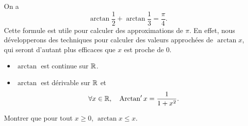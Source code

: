 \documentclass{magnolia}
\begin{document}
\begin{remarqueUnique}
\remarque On a
\[\arctan\frac{1}{2}+\arctan\frac{1}{3}=\frac{\pi}{4}.\]
Cette formule est utile pour calculer des approximations de $\pi$. En effet,
nous développerons des techniques pour calculer des valeurs approchées de
$\arctan x$, qui seront d'autant plus efficaces que $x$ est proche de 0.
\end{remarqueUnique}


\begin{proposition}[utile=-3]
\begin{itemize}
\item $\arctan$ est continue sur $\mathbb{R}$.
\item $\arctan$ est dérivable sur $\mathbb{R}$ et
  \[\forall x\in\mathbb{R} ,\quad \operatorname{Arctan}' x=\frac{1}{1+x^2}.\]
\end{itemize}
\end{proposition}

\begin{exoUnique}
\exo Montrer que pour tout $x\geq 0$, $\arctan x\leq x$.
  
\end{exoUnique}
\end{document}
